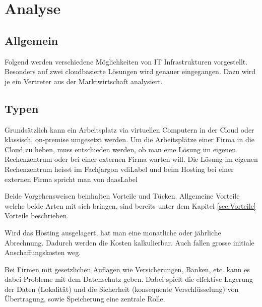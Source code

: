 

\chapter{Analyse}

\section{Allgemein}

Folgend werden verschiedene Möglichkeiten von IT Infrastrukturen vorgestellt.
Besonders auf zwei cloudbasierte Lösungen wird genauer eingegangen. Dazu wird je ein Vertreter aus der Marktwirtschaft analysiert.

\section{Typen}
Grundsätzlich kann ein Arbeitsplatz via virtuellen Computern in der Cloud oder klassisch, on-premise umgesetzt werden.
Um die Arbeitsplätze einer Firma in die Cloud zu heben, muss entschieden werden, ob man eine Lösung im eigenen Rechenzentrum oder bei einer externen Firma warten will.
Die Lösung im eigenen Rechenzentrum heisst im Fachjargon \Gls{vdiLabel} und beim Hosting bei einer externen Firma spricht man von \Gls{daasLabel}

Beide Vorgehensweisen beinhalten Vorteile und Tücken. Allgemeine Vorteile welche beide Arten mit sich bringen, sind bereits unter dem Kapitel \ref{sec:Vorteile} Vorteile beschrieben.

Wird das Hosting ausgelagert, hat man eine monatliche oder jährliche Abrechnung. Dadurch werden die Kosten kalkulierbar. Auch fallen grosse initiale Anschaffungskosten weg.

Bei Firmen mit gesetzlichen Auflagen wie Versicherungen, Banken, etc. kann es dabei Probleme mit dem Datenschutz geben.
Dabei spielt die effektive Lagerung der Daten (Lokalität) und die Sicherheit (konsequente Verschlüsselung) von Übertragung, sowie Speicherung eine zentrale Rolle.

